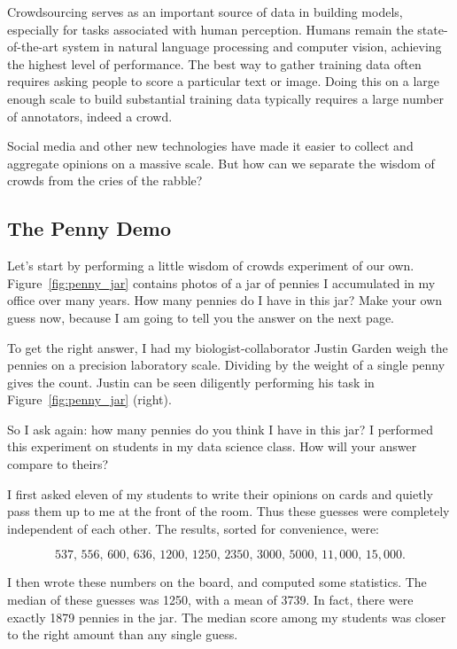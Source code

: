\documentclass[10pt]{article}
\begin{document}
Crowdsourcing serves as an important source of data in building models, especially for tasks associated with human perception. Humans remain the state-of-the-art system in natural language processing and computer vision, achieving the highest level of performance. The best way to gather training data often requires asking people to score a particular text or image. Doing this on a large enough scale to build substantial training data typically requires a large number of annotators, indeed a crowd.

Social media and other new technologies have made it easier to collect and aggregate opinions on a massive scale. But how can we separate the wisdom of crowds from the cries of the rabble?

\subsection{The Penny Demo}

Let's start by performing a little wisdom of crowds experiment of our own. Figure~\ref{fig:penny_jar} contains photos of a jar of pennies I accumulated in my office over many years. How many pennies do I have in this jar? Make your own guess now, because I am going to tell you the answer on the next page.

To get the right answer, I had my biologist-collaborator Justin Garden weigh the pennies on a precision laboratory scale. Dividing by the weight of a single penny gives the count. Justin can be seen diligently performing his task in Figure~\ref{fig:penny_jar} (right).

So I ask again: how many pennies do you think I have in this jar? I performed this experiment on students in my data science class. How will your answer compare to theirs?

I first asked eleven of my students to write their opinions on cards and quietly pass them up to me at the front of the room. Thus these guesses were completely independent of each other. The results, sorted for convenience, were:

$$
537, \, 556, \, 600, \, 636, \, 1200, \, 1250, \, 2350, \, 3000, \, 5000, \, 11{,}000, \, 15{,}000.
$$

I then wrote these numbers on the board, and computed some statistics. The median of these guesses was 1250, with a mean of 3739. In fact, there were exactly 1879 pennies in the jar. The median score among my students was closer to the right amount than any single guess.
\end{document}
